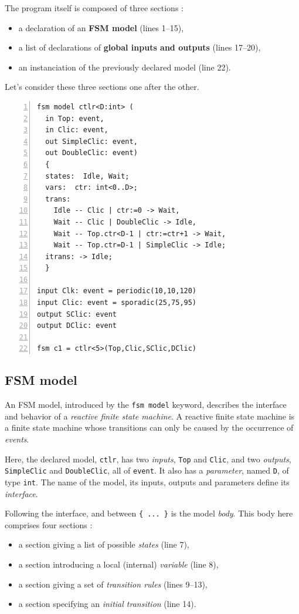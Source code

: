 The program itself is composed of three sections :
\begin{itemize}
\item a declaration of an \textbf{FSM model} (lines 1--15),
\item a list of declarations of \textbf{global inputs and outputs} (lines 17--20),
\item an instanciation of the previously declared model (line 22).
\end{itemize}

Let's consider these three sections one after the other.

\begin{lstlisting}[language=Rfsm,frame=single,numbers=left,caption=An RSFM
  program,label={lst:rfsm-example},float]
fsm model ctlr<D:int> (
  in Top: event,
  in Clic: event,
  out SimpleClic: event,
  out DoubleClic: event)
  {
  states:  Idle, Wait;
  vars:  ctr: int<0..D>;
  trans:
    Idle -- Clic | ctr:=0 -> Wait,
    Wait -- Clic | DoubleClic -> Idle,
    Wait -- Top.ctr<D-1 | ctr:=ctr+1 -> Wait,
    Wait -- Top.ctr=D-1 | SimpleClic -> Idle;
  itrans: -> Idle;
  }

input Clk: event = periodic(10,10,120)
input Clic: event = sporadic(25,75,95)
output SClic: event
output DClic: event

fsm c1 = ctlr<5>(Top,Clic,SClic,DClic)
\end{lstlisting}

\subsection*{FSM model}
\label{sec:fsm-model}

An FSM model, introduced by the \verb|fsm model| keyword, describes the interface and behavior of a
\emph{reactive finite state machine}. A reactive finite state machine is a finite state machine
whose transitions can only be caused by the occurrence of \emph{events}.

Here, the declared model, \verb|ctlr|, has two \emph{inputs}, \verb|Top| and
\verb|Clic|, and two \emph{outputs}, \verb|SimpleClic| and \verb|DoubleClic|, all of \verb|event|.
It also has a \emph{parameter}, named \verb|D|, of type \verb|int|. The name of the model, its
inputs, outputs and parameters define its \emph{interface}. 

Following the interface, and between \verb|{ ... }| is the model \emph{body}. This body here
comprises four sections :
\begin{itemize}
\item a section giving a list of possible \emph{states} (line 7),
\item a section introducing a local (internal) \emph{variable} (line 8),
\item a section giving a set of \emph{transition rules} (lines 9--13),
\item a section specifying an \emph{initial transition} (line 14).
\end{itemize}

